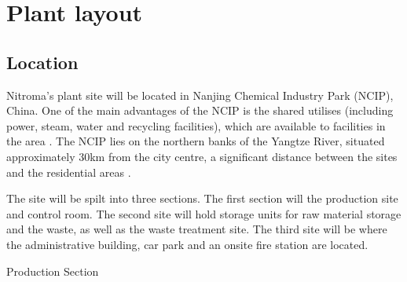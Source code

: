 \section{Plant layout}

\subsection{Location}

Nitroma’s plant site will be located in Nanjing Chemical Industry Park (NCIP), China. One of the main advantages of the NCIP is the shared utilises (including power, steam, water and recycling facilities), which are available to facilities in the area \cite{independent_commodity_intelligence_services_china_2007}. The NCIP lies on the northern banks of the Yangtze River, situated approximately 30km from the city centre, a significant distance between the sites and the residential areas \cite{zeng_divergent_2011}.   


The site will be spilt into three sections. The first section will the production site and control room. The second site will hold storage units for raw material storage and the waste, as well as the waste treatment site. The third site will be where the administrative building, car park and an onsite fire station are located. 

Production Section


